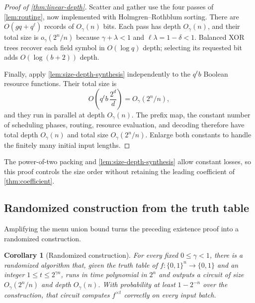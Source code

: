 \documentclass[11pt]{article}
\newtheorem{corollary}[corollary]{Corollary}
\newcommand{\bits}{\{0,1\}}
\begin{document}
\begin{proof}[Proof of \cref{thm:linear-depth}]
Scatter and gather use the four passes of \cref{lem:routing}, now
implemented with Holmgren--Rothblum sorting.  There are
$O(gq+q^\ell)$ records of $O_\gamma(n)$ bits.  Each pass has depth
$O_\gamma(n)$, and their total size is $o_\gamma(2^n/n)$ because
$\gamma+\lambda<1$ and $\ell\lambda=1-\delta<1$.
Balanced XOR trees recover each field symbol in $O(\log q)$ depth;
selecting its requested bit adds $O(\log(b+2))$ depth.

Finally, apply \cref{lem:size-depth-synthesis} independently to the
$q^\ell b$ Boolean resource functions.  Their total size is
\[
  O\left(q^\ell b\,\frac{2^d}{d}\right)
  =O_\gamma(2^n/n),
\]
and they run in parallel at depth $O_\gamma(n)$.
The prefix map, the constant number of scheduling phases, routing,
resource evaluation, and decoding therefore have total depth
$O_\gamma(n)$ and total size $O_\gamma(2^n/n)$.
Enlarge both constants to handle the finitely many initial input lengths.
\end{proof}

The power-of-two packing and \cref{lem:size-depth-synthesis} allow
constant losses, so this proof controls the size order without retaining
the leading coefficient of \cref{thm:coefficient}.

\subsection{Randomized construction from the truth table}

Amplifying the menu union bound turns the preceding existence proof into
a randomized construction.

\begin{corollary}[Randomized construction]\label{cor:randomized-construction}
For every fixed $0\le\gamma<1$, there is a randomized algorithm that,
given the truth table of $f:\bits^n\to\bits$ and an integer
$1\le t\le2^{\gamma n}$, runs in time polynomial in $2^n$ and outputs
a circuit of size $O_\gamma(2^n/n)$ and depth $O_\gamma(n)$.
With probability at least $1-2^{-n}$ over the construction, that circuit
computes $f^{\times t}$ correctly on every input batch.
\end{corollary}
\end{document}
